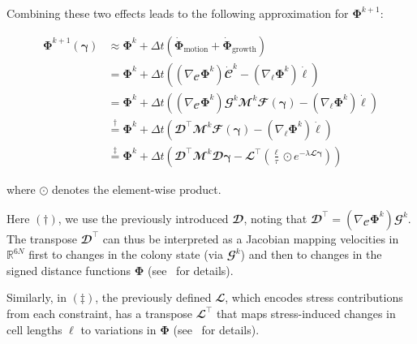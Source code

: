 \documentclass[conference]{IEEEtran}
\begin{document}
\noindent Combining these two effects leads to the following approximation for $\mathbf{\Phi}^{k+1}$:

{\small
\begin{equation}\label{eq:phi_expanded}
    \begin{split}
        \mathbf{\Phi}^{k+1}(\boldsymbol{\gamma}) & \approx \mathbf{\Phi}^k + \Delta t \left( \dot{\mathbf{\Phi}}_{\text{motion}} + \dot{\mathbf{\Phi}}_{\text{growth}} \right)\\
        & = \mathbf{\Phi}^k + \Delta t \left( (\nabla_{\mathbfcal{C}} \mathbf{\Phi}^k) \dot{\mathbfcal{C}}^k - (\nabla_{\boldsymbol{\ell}} \mathbf{\Phi}^k) \dot{\boldsymbol{\ell}} \right)\\
        & = \mathbf{\Phi}^k + \Delta t \left( (\nabla_{\mathbfcal{C}} \mathbf{\Phi}^k) \mathbfcal{G}^k \mathbfcal{M}^k  \mathbfcal{F}(\boldsymbol{\gamma}) - (\nabla_{\boldsymbol{\ell}} \mathbf{\Phi}^k) \dot{\boldsymbol{\ell}} \right)\\
        & \overset{\dagger}{=}
        \mathbf{\Phi}^k + \Delta t \left( \mathbfcal{D}^\top \mathbfcal{M}^k  \mathbfcal{F}(\boldsymbol{\gamma})
        - (\nabla_{\boldsymbol{\ell}} \mathbf{\Phi}^k) \dot{\boldsymbol{\ell}} \right)\\
        & \overset{\ddagger}{=} \mathbf{\Phi}^k + \Delta t \left( \mathbfcal{D}^\top \mathbfcal{M}^k \mathbfcal{D} \boldsymbol{\gamma} - \mathbfcal{L}^\top \left(\frac{\boldsymbol{\ell}}{\tau} \odot e^{-\lambda \mathbfcal{L} \boldsymbol{\gamma}} \right)\right)
    \end{split}
\end{equation}
}

\noindent where $\odot$ denotes the element-wise product.

Here $(\dagger)$, we use the previously introduced $\mathbfcal{D}$, noting that $\mathbfcal{D}^\top = (\nabla_{\mathbfcal{C}} \mathbf{\Phi}^k) \mathbfcal{G}^k$. The transpose $\mathbfcal{D}^\top$ can thus be interpreted as a Jacobian mapping velocities in $\mathbb{R}^{6N}$ first to changes in the colony state (via $\mathbfcal{G}^k$) and then to changes in the signed distance functions $\mathbf{\Phi}$ (see~\cite{Weady2024SM, Tasora2008} for details).

Similarly, in $(\ddagger)$, the previously defined $\mathbfcal{L}$, which encodes stress contributions from each constraint, has a transpose $\mathbfcal{L}^\top$ that maps stress-induced changes in cell lengths $\boldsymbol{\ell}$ to variations in $\mathbf{\Phi}$ (see~\cite{Weady2024SM} for details).
\end{document}
